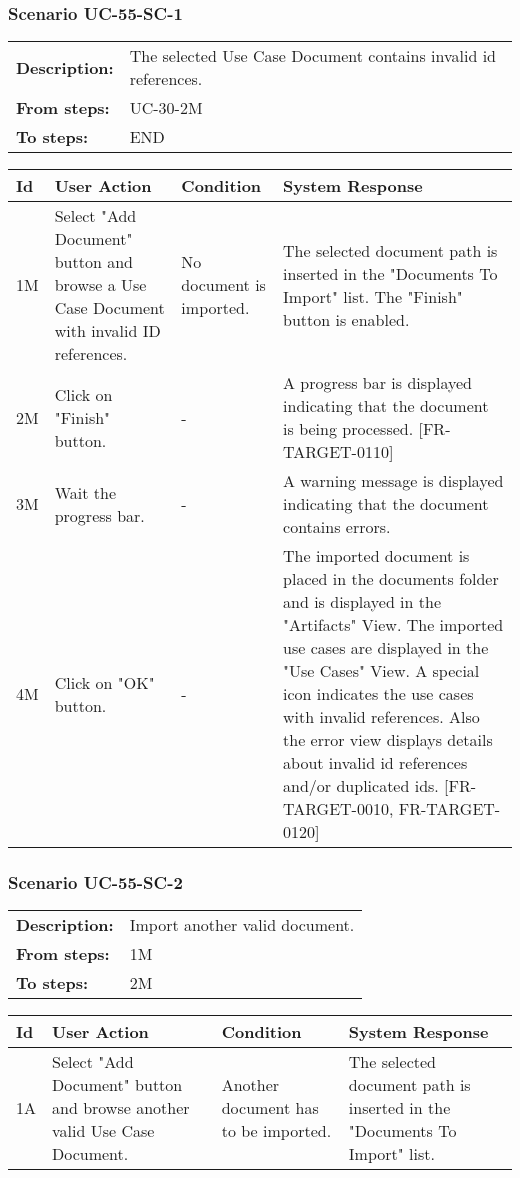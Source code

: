\documentclass[a4paper,11pt]{article}
\newcommand{\bl}{\\ \hline}
\begin{document}
\subsubsection*{Scenario UC-55-SC-1}
\begin{tabular}{p{1in}p{4in}}
{\bf Description:} & The selected Use Case Document contains invalid id references. \\
{\bf From steps:} & UC-30-2M \\
{\bf To steps:} & END \\
\end{tabular}
 
\begin{tabular}{|p{0.8in}|p{1.6in}|p{1.6in}|p{1.6in}|}
\hline
Id & User Action & Condition & System Response  \bl 
1M & Select "Add Document" button and browse a Use Case Document with invalid ID references. & No document is imported. & The selected document path is inserted in the "Documents To Import" list. The "Finish" button is enabled. \bl 
2M & Click on "Finish" button. & - & A progress bar is displayed indicating that the document is being processed. [FR-TARGET-0110] \bl 
3M & Wait the progress bar. & - & A warning message is displayed indicating that the document contains errors. \bl 
4M & Click on "OK" button. & - & The imported document is placed in the documents folder and is displayed in the "Artifacts" View. The imported use cases are displayed in the "Use Cases" View. A special icon indicates the use cases with invalid references. Also the error view displays details about invalid id references and/or duplicated ids. [FR-TARGET-0010, FR-TARGET-0120] \bl 
\end{tabular}
\subsubsection*{Scenario UC-55-SC-2}
\begin{tabular}{p{1in}p{4in}}
{\bf Description:} & Import another valid document. \\
{\bf From steps:} & 1M \\
{\bf To steps:} & 2M \\
\end{tabular}
 
\begin{tabular}{|p{0.8in}|p{1.6in}|p{1.6in}|p{1.6in}|}
\hline
Id & User Action & Condition & System Response  \bl 
1A & Select "Add Document" button and browse another valid Use Case Document. & Another document has to be imported. & The selected document path is inserted in the "Documents To Import" list. \bl 
\end{tabular}
\end{document}
